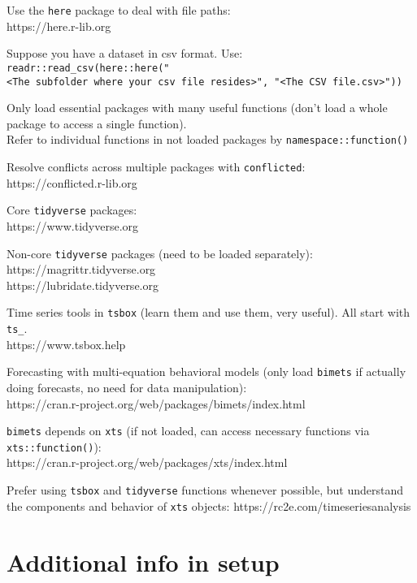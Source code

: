 \documentclass[
  letterpaper,
  DIV=11,
  numbers=noendperiod]{scrreport}
\begin{document}
Use the \texttt{here} package to deal with file paths:\\
https://here.r-lib.org

Suppose you have a dataset in csv format. Use:\\
\texttt{readr::read\_csv(here::here("\textless{}The\ subfolder\ where\ your\ csv\ file\ resides\textgreater{}",\ "\textless{}The\ CSV\ file.csv\textgreater{}"))}

Only load essential packages with many useful functions (don't load a
whole package to access a single function).\\
Refer to individual functions in not loaded packages by
\texttt{namespace::function()}

Resolve conflicts across multiple packages with \texttt{conflicted}:\\
https://conflicted.r-lib.org

Core \texttt{tidyverse} packages:\\
https://www.tidyverse.org

Non-core \texttt{tidyverse} packages (need to be loaded separately):\\
https://magrittr.tidyverse.org\\
https://lubridate.tidyverse.org

Time series tools in \texttt{tsbox} (learn them and use them, very
useful). All start with \texttt{ts\_}.\\
https://www.tsbox.help

Forecasting with multi-equation behavioral models (only load
\texttt{bimets} if actually doing forecasts, no need for data
manipulation):\\
https://cran.r-project.org/web/packages/bimets/index.html

\texttt{bimets} depends on \texttt{xts} (if not loaded, can access
necessary functions via \texttt{xts::function()}):\\
https://cran.r-project.org/web/packages/xts/index.html

Prefer using \texttt{tsbox} and \texttt{tidyverse} functions whenever
possible, but understand the components and behavior of \texttt{xts}
objects: https://rc2e.com/timeseriesanalysis

\hypertarget{additional-info-in-setup}{%
\section{Additional info in setup}\label{additional-info-in-setup}}
\end{document}
